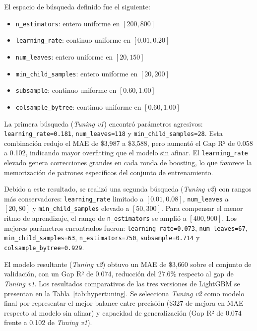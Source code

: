 \documentclass[conference]{IEEEtran}
\begin{document}
El espacio de búsqueda definido fue el siguiente:

\begin{itemize}
    \item \texttt{n\_estimators}: entero uniforme en $[200, 800]$
    \item \texttt{learning\_rate}: continuo uniforme en $[0.01, 0.20]$
    \item \texttt{num\_leaves}: entero uniforme en $[20, 150]$
    \item \texttt{min\_child\_samples}: entero uniforme en $[20, 200]$
    \item \texttt{subsample}: continuo uniforme en $[0.60, 1.00]$
    \item \texttt{colsample\_bytree}: continuo uniforme en $[0.60, 1.00]$
\end{itemize}

La primera búsqueda (\textit{Tuning v1}) encontró parámetros agresivos: \texttt{learning\_rate=0.181}, \texttt{num\_leaves=118} y \texttt{min\_child\_samples=28}. Esta combinación redujo el MAE de \$3{,}987 a \$3{,}588, pero aumentó el Gap R² de 0.058 a 0.102, indicando mayor overfitting que el modelo sin afinar. El \texttt{learning\_rate} elevado genera correcciones grandes en cada ronda de boosting, lo que favorece la memorización de patrones específicos del conjunto de entrenamiento.

Debido a este resultado, se realizó una segunda búsqueda (\textit{Tuning v2}) con rangos más conservadores: \texttt{learning\_rate} limitado a $[0.01, 0.08]$, \texttt{num\_leaves} a $[20, 80]$ y \texttt{min\_child\_samples} elevado a $[50, 300]$. Para compensar el menor ritmo de aprendizaje, el rango de \texttt{n\_estimators} se amplió a $[400, 900]$. Los mejores parámetros encontrados fueron: \texttt{learning\_rate=0.073}, \texttt{num\_leaves=67}, \texttt{min\_child\_samples=63}, \texttt{n\_estimators=750}, \texttt{subsample=0.714} y \texttt{colsample\_bytree=0.929}.

El modelo resultante (\textit{Tuning v2}) obtuvo un MAE de \$3{,}660 sobre el conjunto de validación, con un Gap R² de 0.074, reducción del 27.6\% respecto al gap de \textit{Tuning v1}. Los resultados comparativos de las tres versiones de LightGBM se presentan en la Tabla~\ref{tab:hypertuning}. Se selecciona \textit{Tuning v2} como modelo final por representar el mejor balance entre precisión (\$327 de mejora en MAE respecto al modelo sin afinar) y capacidad de generalización (Gap R² de 0.074 frente a 0.102 de \textit{Tuning v1}).
\end{document}
